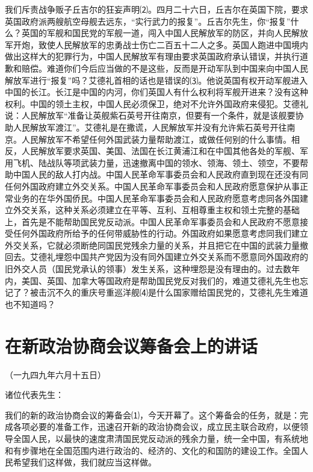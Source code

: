 \documentclass[UTF-8, a5paper, 12pt]{ctexart}
\begin{document}
我们斥责战争贩子丘吉尔的狂妄声明⑵。四月二十六日，丘吉尔在英国下院，要求英国政府派两艘航空母舰去远东，“实行武力的报复”。丘吉尔先生，你“报复”什么？英国的军舰和国民党的军舰一道，闯入中国人民解放军的防区，并向人民解放军开炮，致使人民解放军的忠勇战士伤亡二百五十二人之多。英国人跑进中国境内做出这样大的犯罪行为，中国人民解放军有理由要求英国政府承认错误，并执行道歉和赔偿。难道你们今后应当做的不是这些，反而是开动军队到中国来向中国人民解放军进行“报复”吗？艾德礼首相的话也是错误的⑶。他说英国有权开动军舰进入中国的长江。长江是中国的内河，你们英国人有什么权利将军舰开进来？没有这种权利。中国的领土主权，中国人民必须保卫，绝对不允许外国政府来侵犯。艾德礼说：人民解放军“准备让英舰紫石英号开往南京，但要有一个条件，就是该舰要协助人民解放军渡江”。艾德礼是在撒谎，人民解放军并没有允许紫石英号开往南京。人民解放军不希望任何外国武装力量帮助渡江，或做任何别的什么事情。相反，人民解放军要求英国、美国、法国在长江黄浦江和在中国其他各处的军舰、军用飞机、陆战队等项武装力量，迅速撤离中国的领水、领海、领土、领空，不要帮助中国人民的敌人打内战。中国人民革命军事委员会和人民政府直到现在还没有同任何外国政府建立外交关系。中国人民革命军事委员会和人民政府愿意保护从事正常业务的在华外国侨民。中国人民革命军事委员会和人民政府愿意考虑同各外国建立外交关系，这种关系必须建立在平等、互利、互相尊重主权和领土完整的基础上，首先是不能帮助国民党反动派。中国人民革命军事委员会和人民政府不愿意接受任何外国政府所给予的任何带威胁性的行动。外国政府如果愿意考虑同我们建立外交关系，它就必须断绝同国民党残余力量的关系，并且把它在中国的武装力量撤回去。艾德礼埋怨中国共产党因为没有同外国建立外交关系而不愿意同外国政府的旧外交人员（国民党承认的领事）发生关系，这种埋怨是没有理由的。过去数年内，美国、英国、加拿大等国政府是帮助国民党反对我们的，难道艾德礼先生也忘记了？被击沉不久的重庆号重巡洋舰⑷是什么国家赠给国民党的，艾德礼先生难道也不知道吗？

\section{在新政治协商会议筹备会上的讲话}

（一九四九年六月十五日）

诸位代表先生：

我们的新的政治协商会议的筹备会⑴，今天开幕了。这个筹备会的任务，就是：完成各项必要的准备工作，迅速召开新的政治协商会议，成立民主联合政府，以便领导全国人民，以最快的速度肃清国民党反动派的残余力量，统一全中国，有系统地和有步骤地在全国范围内进行政治的、经济的、文化的和国防的建设工作。全国人民希望我们这样做，我们就应当这样做。
\end{document}
